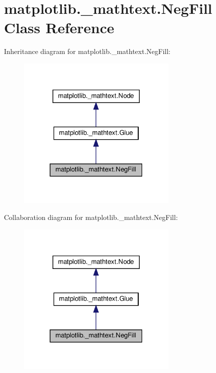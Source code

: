 \hypertarget{classmatplotlib_1_1__mathtext_1_1NegFill}{}\section{matplotlib.\+\_\+mathtext.\+Neg\+Fill Class Reference}
\label{classmatplotlib_1_1__mathtext_1_1NegFill}


Inheritance diagram for matplotlib.\+\_\+mathtext.\+Neg\+Fill\+:
\nopagebreak
\begin{figure}[H]
\begin{center}
\leavevmode
\includegraphics[width=219pt]{classmatplotlib_1_1__mathtext_1_1NegFill__inherit__graph}
\end{center}
\end{figure}


Collaboration diagram for matplotlib.\+\_\+mathtext.\+Neg\+Fill\+:
\nopagebreak
\begin{figure}[H]
\begin{center}
\leavevmode
\includegraphics[width=219pt]{classmatplotlib_1_1__mathtext_1_1NegFill__coll__graph}
\end{center}
\end{figure}
